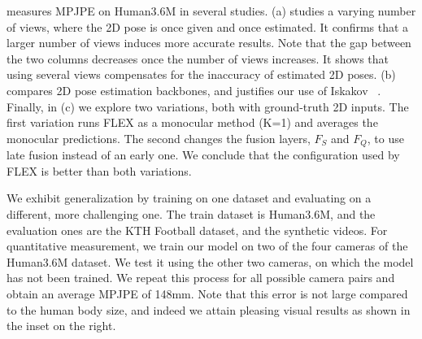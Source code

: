  measures MPJPE on Human3.6M in several studies.
(a) studies a varying number of views, where the 2D pose is once given and once estimated. It confirms that a larger number of views induces more accurate results. Note that the gap between the two columns decreases once the number of views increases. It shows that using several views compensates for the inaccuracy of estimated 2D poses. 
%
(b) compares 2D pose estimation backbones, and justifies our use of Iskakov \etal~\cite{iskakov2019learnable}.
%
Finally, in (c) we explore
two variations, both with ground-truth 2D inputs. 
The first variation runs FLEX as a monocular method (K=1) and averages the monocular predictions.
%
The second changes the fusion layers, $F_S$ and $F_Q$, to use late fusion instead of an early one. 
We conclude that the configuration used by FLEX is better than both variations.



%
%
We exhibit generalization by training on one dataset and evaluating on a different, more challenging one. The train dataset is Human3.6M, and the evaluation ones are the KTH Football dataset, and the synthetic videos.
%
For quantitative measurement, we train our model on two of the four cameras of the Human3.6M dataset.
We test it using the other two cameras, on which the model has not been trained. 
We repeat this process for all possible camera pairs and obtain an average MPJPE of 148mm. Note that this error is not large compared to the human body size, and indeed we attain pleasing visual results as shown in the inset on the right.

